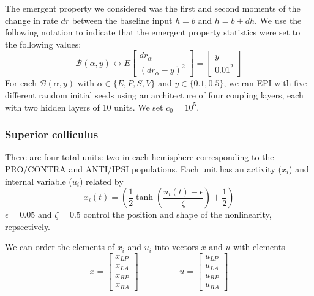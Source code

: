\documentclass[11pt]{article}
\begin{document}
The emergent property we considered was the first and second moments of the change in rate $dr$ between the baseline input $h= b$ and $h = b + dh$.  We use the following notation to indicate that the emergent property statistics were set to the following values:
\begin{equation}
\mathcal{B}(\alpha, y) \leftrightarrow 
E \begin{bmatrix} dr_\alpha \\ (dr_\alpha - y)^2 \end{bmatrix} = \begin{bmatrix} y \\ 0.01^2 \end{bmatrix}
\end{equation}
For each $\mathcal{B}(\alpha, y)$ with $\alpha \in \{E, P, S, V\}$ and $y \in \{0.1, 0.5\}$, we ran EPI with five different random initial seeds using an architecture of four coupling layers, each with two hidden layers of 10 units.  We set $c_0 = 10^5$.

\subsubsection{Superior colliculus}
There are four total units: two in each hemisphere corresponding to the PRO/CONTRA and ANTI/IPSI populations.  Each unit has an activity ($x_i$) and internal variable ($u_i$) related by
\begin{equation}
x_i(t) =\left(\frac{1}{2}\tanh\left(\frac{u_i(t) - \epsilon}{\zeta}\right)+ \frac{1}{2} \right)
\end{equation}
$\epsilon = 0.05$ and $\zeta = 0.5$ control the position and shape of the nonlinearity, repsectively.

We can order the elements of $x_i$ and $u_i$ into vectors $x$ and $u$ with elements
\begin{equation}
x = \begin{bmatrix} x_{LP} \\ x_{LA} \\ x_{RP} \\ x_{RA} \end{bmatrix} \hspace{2cm} u = \begin{bmatrix} u_{LP} \\ u_{LA} \\ u_{RP} \\ u_{RA} \end{bmatrix}
\end{equation}
\end{document}
